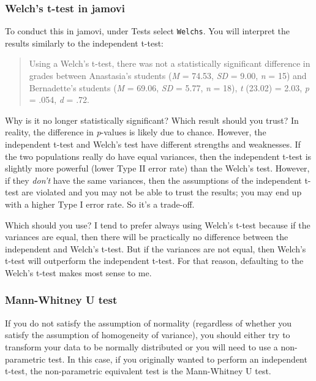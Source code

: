 \documentclass[
]{book}
\begin{document}
\hypertarget{welchs-t-test-in-jamovi}{%
\subsubsection{Welch's t-test in jamovi}\label{welchs-t-test-in-jamovi}}

To conduct this in jamovi, under Tests select \texttt{Welch\textquotesingle{}s}. You will interpret the results similarly to the independent t-test:

\begin{quote}
Using a Welch's t-test, there was not a statistically significant difference in grades between Anastasia's students (\emph{M} = 74.53, \emph{SD} = 9.00, \emph{n} = 15) and Bernadette's students (\emph{M} = 69.06, \emph{SD} = 5.77, \emph{n} = 18), \emph{t} (23.02) = 2.03, \emph{p} = .054, \emph{d} = .72.
\end{quote}

Why is it no longer statistically significant? Which result should you trust? In reality, the difference in \emph{p}-values is likely due to chance. However, the independent t-test and Welch's test have different strengths and weaknesses. If the two populations really do have equal variances, then the independent t-test is slightly more powerful (lower Type II error rate) than the Welch's test. However, if they \emph{don't} have the same variances, then the assumptions of the independent t-test are violated and you may not be able to trust the results; you may end up with a higher Type I error rate. So it's a trade-off.

Which should you use? I tend to prefer always using Welch's t-test because if the variances are equal, then there will be practically no difference between the independent and Welch's t-test. But if the variances are not equal, then Welch's t-test will outperform the independent t-test. For that reason, defaulting to the Welch's t-test makes most sense to me.

\hypertarget{mann-whitney-u-test}{%
\subsubsection{Mann-Whitney U test}\label{mann-whitney-u-test}}

If you do not satisfy the assumption of normality (regardless of whether you satisfy the assumption of homogeneity of variance), you should either try to transform your data to be normally distributed or you will need to use a non-parametric test. In this case, if you originally wanted to perform an independent t-test, the non-parametric equivalent test is the Mann-Whitney U test.
\end{document}
